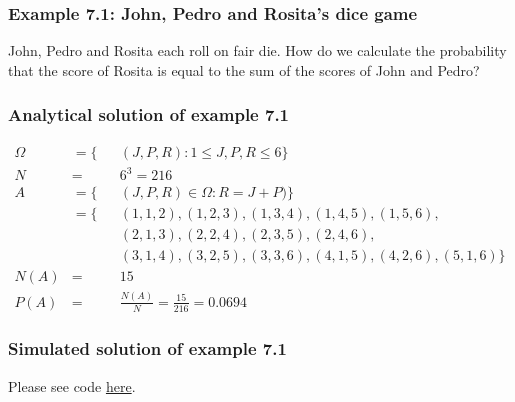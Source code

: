 \begin{frame}
    \frametitle{Example 7.1: John, Pedro and Rosita's dice game}

    \begin{manualProbExample}{7.1}
        John, Pedro and Rosita each roll on fair die. How do we calculate the
        probability that the score of Rosita is equal to the sum of the scores
        of John and Pedro?
    \end{manualProbExample}


\end{frame}

\begin{frame}
    \frametitle{Analytical solution of example 7.1}

    \begin{alignat*}{2}
        \Omega&=\{&&(J,P,R):1\le J,P,R\le 6\}\\
        N&=&&6^3=216\\
        A&=\{&&(J,P,R)\in\Omega:R=J+P)\}\\
         &=\{&&(1,1,2),(1,2,3),(1,3,4),(1,4,5),(1,5,6),\\
         &   &&(2,1,3),(2,2,4),(2,3,5),(2,4,6),\\
         &   &&(3,1,4),(3,2,5),(3,3,6),(4,1,5),(4,2,6),(5,1,6)\}\\
        N(A)&=&&15\\
        P(A)&=&&\frac{N(A)}{N}=\frac{15}{216}=0.0694
    \end{alignat*}

\end{frame}

\begin{frame}[fragile]
    \frametitle{Simulated solution of example 7.1}

    Please see code \href{https://joacorapela.github.io/gcnuBridging2023/auto_examples/foundations/plot_example7_1.html#sphx-glr-auto-examples-foundations-plot-example7-1-py}{here}.

\end{frame}


